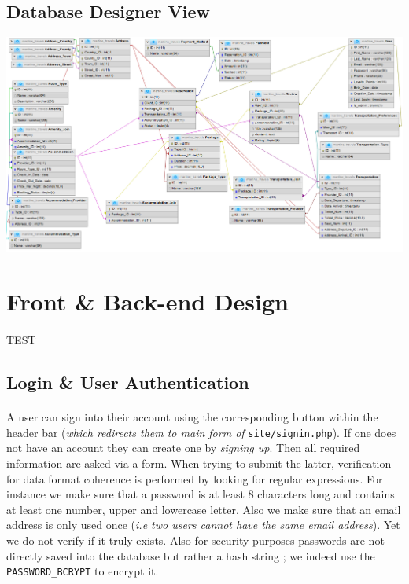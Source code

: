 \documentclass[11pt,a4paper,titlepage]{article}
\begin{document}
\subsection{Database Designer View}
\includegraphics[scale=0.7,angle=90]{diag_2.png}

\section{Front \& Back-end Design}
\paragraph{} TEST

\subsection{Login \& User Authentication}
\paragraph{}
A user can sign into their account using the corresponding button within the header bar (\textit{which redirects them to main form of} \verb|site/signin.php|). If one does not have an account they can create one by \textit{signing up}. Then all required information are asked via a form. When trying to submit the latter, verification for data format coherence is performed by looking for regular expressions. For instance we make sure that a password is at least 8 characters long and contains at least one number, upper and lowercase letter. Also we make sure that an email address is only used once (\textit{i.e two users cannot have the same email address}). Yet we do not verify if it truly exists. Also for security purposes passwords are not directly saved into the database but rather a hash string ; we indeed use the \verb|PASSWORD_BCRYPT| to encrypt it.
\end{document}
